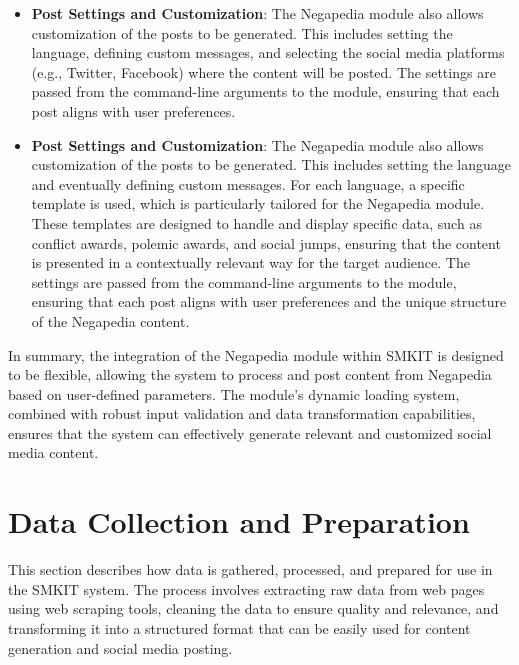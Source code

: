 \begin{itemize}
    \item \textbf{Post Settings and Customization}: The Negapedia module also allows customization of the posts to be generated. This includes setting the language, defining custom messages, and selecting the social media platforms (e.g., Twitter, Facebook) where the content will be posted. The settings are passed from the command-line arguments to the module, ensuring that each post aligns with user preferences.

    \item \textbf{Post Settings and Customization}: The Negapedia module also allows customization of the posts to be generated. This includes setting the language and eventually defining custom messages. For each language, a specific template is used, which is particularly tailored for the Negapedia module. These templates are designed to handle and display specific data, such as conflict awards, polemic awards, and social jumps, ensuring that the content is presented in a contextually relevant way for the target audience. The settings are passed from the command-line arguments to the module, ensuring that each post aligns with user preferences and the unique structure of the Negapedia content.
\end{itemize}

In summary, the integration of the Negapedia module within SMKIT is designed to be flexible, allowing the system to process and post content from Negapedia based on user-defined parameters. The module's dynamic loading system, combined with robust input validation and data transformation capabilities, ensures that the system can effectively generate relevant and customized social media content.

\section{Data Collection and Preparation}
\label{sec:data_collection_and_preparation}
This section describes how data is gathered, processed, and prepared for use in the SMKIT system. The process involves extracting raw data from web pages using web scraping tools, cleaning the data to ensure quality and relevance, and transforming it into a structured format that can be easily used for content generation and social media posting.

